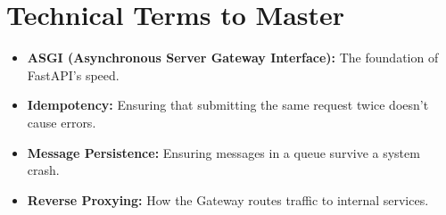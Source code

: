 \documentclass[12pt]{article}
\begin{document}
\section{Technical Terms to Master}
\begin{itemize}
    \item \textbf{ASGI (Asynchronous Server Gateway Interface):} The foundation of FastAPI's speed.
    \item \textbf{Idempotency:} Ensuring that submitting the same request twice doesn't cause errors.
    \item \textbf{Message Persistence:} Ensuring messages in a queue survive a system crash.
    \item \textbf{Reverse Proxying:} How the Gateway routes traffic to internal services.
\end{itemize}
\end{document}
